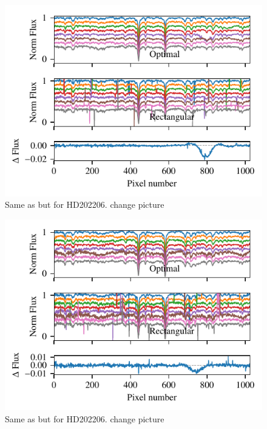  \begin{figure}
    \centering
    \includegraphics[width=0.7\linewidth]{figures/appendix/bp_plots/extraction_comparision_HD202206-2_chip_1}
    \caption{Same as  but for HD202206. {\red{} change picture}}
    \label{fig:artefact_example4a}
\end{figure}
 \begin{figure}
     \centering
     \includegraphics[width=0.7\linewidth]{figures/appendix/bp_plots/extraction_comparision_HD202206-3_chip_1}
     \caption{Same as  but for HD202206. {\red{} change picture}}
     \label{fig:artefact_example4}
 \end{figure}


